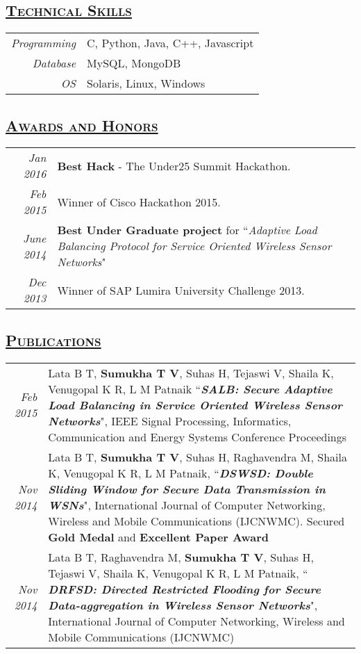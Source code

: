 \documentclass[14pt]{article}
\begin{document}
\subsection* {\scshape\large\uline {Technical Skills}}
\begin{tabular}{r l}
\emph{Programming} & C, Python, Java, C++, Javascript \\
\emph{Database}	  & MySQL, MongoDB \\
\emph{OS} & Solaris, Linux, Windows
\end{tabular}

\subsection* {\scshape\large\uline {Awards and Honors}}
\begin{tabularx}{\textwidth}{r X}
\emph{Jan 2016} &  \textbf{Best Hack} - The Under25 Summit Hackathon.\\ 
\emph{Feb 2015} & Winner of Cisco Hackathon 2015.\\ 
\emph{June 2014} & \textbf{Best Under Graduate project} for ``\emph{Adaptive Load Balancing Protocol for Service Oriented Wireless Sensor Networks}" \\ 
\emph{Dec 2013} & Winner of SAP Lumira University Challenge 2013. \\ 
\end{tabularx}

\subsection* {\scshape\large\uline {Publications}}
\begin{tabularx}{\textwidth}{r X}
\emph{Feb 2015} & Lata B T, \textbf{Sumukha T V}, Suhas H, Tejaswi V, Shaila K, Venugopal K R, L M Patnaik ``\textbf{\textit{SALB: Secure Adaptive Load 		         Balancing in Service Oriented Wireless Sensor Networks}}",  IEEE Signal Processing, Informatics, Communication and Energy Systems Conference Proceedings \\ 
\emph{Nov 2014} & Lata B T, \textbf{Sumukha T V}, Suhas H, Raghavendra M, Shaila K, Venugopal K R, L M Patnaik, ``\textbf{\textit{DSWSD: Double Sliding Window for Secure Data Transmission in WSNs}}", International Journal of Computer Networking, Wireless and Mobile Communications (IJCNWMC). Secured \textbf{Gold Medal} and \textbf{Excellent Paper Award} \\ 
\emph{Nov 2014} & Lata B T, Raghavendra M,  \textbf{Sumukha T V}, Suhas H, Tejaswi V, Shaila K, Venugopal K R, L M Patnaik, `` \textbf{\textit{DRFSD: Directed Restricted Flooding for Secure Data-aggregation in Wireless Sensor Networks}}", International Journal of Computer Networking, Wireless and Mobile Communications (IJCNWMC)
\end{tabularx}
\end{document}
